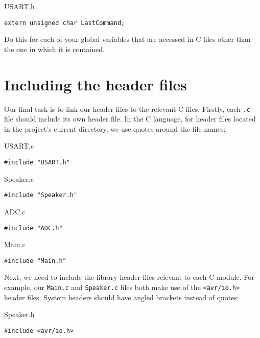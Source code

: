 \documentclass[a4paper,oneside]{book}
\begin{document}
USART.h
\begin{center}
\begin{lstlisting}
extern unsigned char LastCommand;
\end{lstlisting}
\end{center}

Do this for each of your global variables that are accessed in C files other than the one in which it is contained.

\section{Including the header files}

Our final task is to link our header files to the relevant C files. Firstly, each \texttt{.c} file should include its own header file. In the C language, for header files located in the project's current directory, we use quotes around the file names:

USART.c
\begin{center}
\begin{lstlisting}
#include "USART.h"
\end{lstlisting}
\end{center}

Speaker.c
\begin{center}
\begin{lstlisting}
#include "Speaker.h"
\end{lstlisting}
\end{center}

ADC.c
\begin{center}
\begin{lstlisting}
#include "ADC.h"
\end{lstlisting}
\end{center}

Main.c
\begin{center}
\begin{lstlisting}
#include "Main.h"
\end{lstlisting}
\end{center}

Next, we need to include the library header files relevant to each C module. For example, our \texttt{Main.c} and \texttt{Speaker.c} files both make use of the \texttt{<avr/io.h>} header files. System headers should have angled brackets instead of quotes:

Speaker.h
\begin{center}
\begin{lstlisting}
#include <avr/io.h>
\end{lstlisting}
\end{center}
\end{document}
